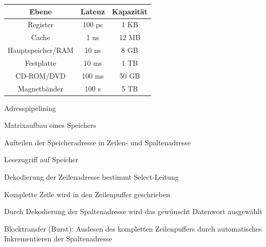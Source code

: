 \documentclass[10pt,landscape]{article}
\begin{document}
\begin{multicols}{3}
  \begin{center}
    \begin{tabular}{c | c | c}
      Ebene             & Latenz & Kapazität \\\hline
      Register          & 100 ps & 1 KB      \\
      Cache             & 1 ns   & 12 MB     \\
      Hauptspeicher/RAM & 10 ns  & 8 GB      \\
      Festplatte        & 10 ms  & 1 TB      \\
      CD-ROM/DVD        & 100 ms & 50 GB     \\
      Magnetbänder      & 100 s  & 5 TB
    \end{tabular}
  \end{center}
  
  Adresspipelining
  \begin{itemize*}
    \item Matrixaufbau eines Speichers
    \item Aufteilen der Speicheradresse in Zeilen- und Spaltenadresse
  \end{itemize*}
  Lesezugriff auf Speicher
  \begin{itemize*}
    \item Dekodierung der Zeilenadresse bestimmt Select-Leitung
    \item Komplette Zeile wird in den Zeilenpuffer geschrieben
    \item Durch Dekodierung der Spaltenadresse wird das gewünscht Datenwort ausgewählt
    \item Blocktransfer (Burst): Auslesen des kompletten Zeilenpuffers durch automatisches Inkrementieren der Spaltenadresse
  \end{itemize*}
  

\end{multicols}
\end{document}
